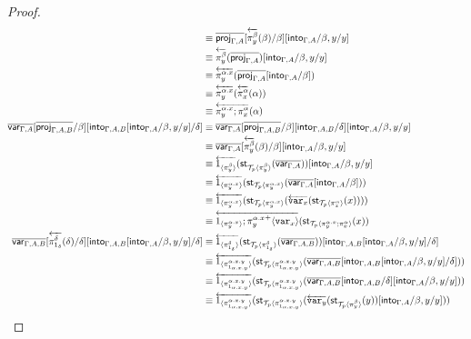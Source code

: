 \documentclass[10pt]{article}
\theoremstyle{definition}
\newcommand{\rewrite}[2]{\overleftarrow{#1}(#2)}
\newcommand\StI[2]{\ensuremath{\mathsf{st}_{#1}(#2)}}
\newcommand\ApEl[2]{\mathcal{T}_{#1}\langle#2\rangle}
\newcommand\ApPlus[2]{\ensuremath{{#1}^+ \langle #2 \rangle }}
\begin{document}
\begin{proof}
\begin{align*}
&\equiv \upstairs{\proj{\Gamma, A}}[\rewrite{\pi^\beta_y}{\beta}/\beta][\into{\Gamma, A}/\beta, y/y] \\
&\equiv \rewrite{\pi^\beta_y}{\upstairs{\proj{\Gamma, A}}}[\into{\Gamma, A}/\beta, y/y] \\
&\equiv \rewrite{\pi^{\alpha.x}_y}{\upstairs{\proj{\Gamma, A}}[\into{\Gamma, A}/\beta]} \\
&\equiv \rewrite{\pi^{\alpha.x}_y}{\rewrite{\pi^\alpha_x}{\alpha}} \\
&\equiv \rewrite{\pi^{\alpha.x}_y;\pi^\alpha_x}{\alpha} \\
\upstairs{\qvar{\Gamma, A}}[\upstairs{\proj{\Gamma, A, B}}/\beta][\into{\Gamma, A, B}[\into{\Gamma, A}/\beta, y/y]/\delta]
&\equiv \upstairs{\qvar{\Gamma, A}}[\upstairs{\proj{\Gamma, A, B}}/\beta][\into{\Gamma, A, B}/\delta][\into{\Gamma, A}/\beta, y/y] \\
&\equiv \upstairs{\qvar{\Gamma, A}}[\rewrite{\pi^\beta_y}{\beta}/\beta][\into{\Gamma, A}/\beta, y/y] \\
&\equiv \rewrite{\ApOne{\pi^\beta_y}}{\StI{\ApEl{p}{\pi^\beta_y}}{\upstairs{\qvar{\Gamma, A}}}}[\into{\Gamma, A}/\beta, y/y] \\
&\equiv \rewrite{\ApOne{\pi^{\alpha.x}_y}}{\StI{\ApEl{p}{\pi^{\alpha.x}_y}}{\upstairs{\qvar{\Gamma, A}}[\into{\Gamma, A}/\beta]}} \\
&\equiv \rewrite{\ApOne{\pi^{\alpha.x}_y}}{\StI{\ApEl{p}{\pi^{\alpha.x}_y}}{\rewrite{\var{x}}{\StI{\ApEl{p}{\pi^{\alpha}_x}}{x}}}} \\
&\equiv \rewrite{\ApOne{\pi^{\alpha.x}_y};\ApPlus{\pi^{\alpha.x}_y}{\var{x}}}{\StI{\ApEl{p}{\pi^{\alpha.x}_y;\pi^{\alpha}_x}}{x}} \\
\upstairs{\qvar{\Gamma, A, B}}[\rewrite{\pi^\delta_{1_\delta}}{\delta}/\delta][\into{\Gamma, A, B}[\into{\Gamma, A}/\beta, y/y]/\delta]
&\equiv \rewrite{\ApOne{\pi^\delta_{1_\delta}}}{\StI{\ApEl{p}{\pi^\delta_{1_\delta}}}{\upstairs{\qvar{\Gamma, A, B}}}}[\into{\Gamma, A, B}[\into{\Gamma, A}/\beta, y/y]/\delta] \\
&\equiv \rewrite{\ApOne{\pi^{\alpha.x.y}_{1_{\alpha.x.y}}}}{\StI{\ApEl{p}{\pi^{\alpha.x.y}_{1_{\alpha.x.y}}}}{\upstairs{\qvar{\Gamma, A, B}}[\into{\Gamma, A, B}[\into{\Gamma, A}/\beta, y/y]/\delta]}} \\
&\equiv \rewrite{\ApOne{\pi^{\alpha.x.y}_{1_{\alpha.x.y}}}}{\StI{\ApEl{p}{\pi^{\alpha.x.y}_{1_{\alpha.x.y}}}}{\upstairs{\qvar{\Gamma, A, B}}[\into{\Gamma, A, B}/\delta][\into{\Gamma, A}/\beta, y/y]}} \\
&\equiv \rewrite{\ApOne{\pi^{\alpha.x.y}_{1_{\alpha.x.y}}}}{\StI{\ApEl{p}{\pi^{\alpha.x.y}_{1_{\alpha.x.y}}}}{\rewrite{\var{y}}{\StI{\ApEl{p}{\pi^{\beta}_y}}{y}}[\into{\Gamma, A}/\beta, y/y]}} \\

\end{align*}
\end{proof}
\end{document}
